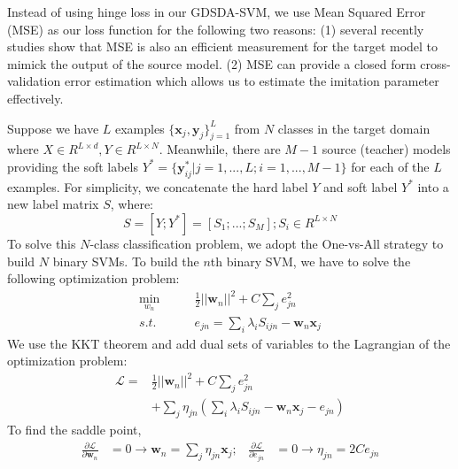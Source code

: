 Instead of using hinge loss in our GDSDA-SVM, we use Mean Squared Error (MSE) as our loss function for the following two reasons: (1) several recently studies \cite{ba2014deep,luo2016face,romero2014fitnets,urban2016deep} show that MSE is also an efficient measurement for the target model to mimick the output of the source model. (2) MSE can provide a closed form cross-validation error estimation which allows us to estimate the imitation parameter effectively. 

Suppose we have $L$ examples $\{\textbf{x}_j,\textbf{y}_j\}_{j=1}^L$ from $N$ classes in the target domain where $X\in R^{L\times d}, Y\in R^{L\times N}$. Meanwhile, there are $M-1$ source (teacher) models providing the soft labels $Y^*=\{\textbf{y}^*_{ij}|j=1,...,L;i=1,...,M-1\}$ for each of the $L$ examples.
For simplicity, we concatenate the hard label $Y$ and soft label $Y^*$ into a new label matrix $S$, where:
\[S=[Y;Y^*]=[S_1;...;S_M]; S_i \in R^{L \times N}\]
To solve this $N$-class classification problem, we adopt the One-vs-All strategy to build $N$ binary SVMs.
To build the $n$th binary SVM, we have to solve the following optimization problem: 
\begin{equation}\label{eq:multi-distill}
\begin{aligned}
\underset{w_n}{\min} \qquad & \frac{1}{2}{|| \textbf{w}_n ||^2} + C\sum_{j}{e_{jn}^2} \quad\\
s.t. \qquad& e_{jn} = \sum_i\lambda_iS_{ijn} - \textbf{w}_n\textbf{x}_j%
\end{aligned}  
\end{equation}
We use the KKT theorem \cite{cristianini2000introduction} and add dual sets of variables to the Lagrangian of the optimization problem:
\begin{equation}
\begin{aligned}
\mathcal{L}=&\frac{1}{2}{|| \textbf{w}_n ||^2} + C\sum_{j} {e_{jn}^2}\\
&+\sum_{j}\eta_{jn}\left(\sum_i\lambda_iS_{ijn} - \textbf{w}_n\textbf{x}_j-e_{jn}\right)%
\end{aligned}
\end{equation}
To find the saddle point, 
\begin{equation}
\begin{aligned}
\frac{{\partial \mathcal{L}}}{{\partial \textbf{w}_n}}& =0 \rightarrow \textbf{w}_n = \sum_{j}\eta_{jn} {\textbf{x}_j}; &
\frac{{\partial \mathcal{L}}}{{\partial {e_{jn}}}} & =0 \rightarrow \eta_{jn} = 2C {e_{jn}}\\
\end{aligned}
\end{equation}

